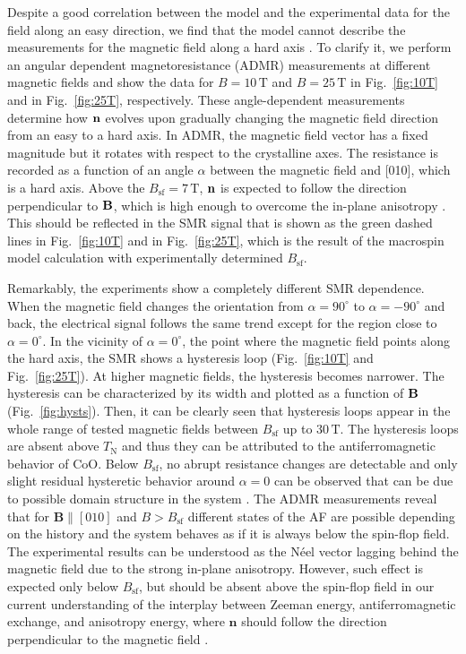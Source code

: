 \documentclass[%
 aps,
prl,
superscriptaddress,
 amsmath,amssymb,
reprint,%
]{revtex4-2}
\begin{document}
Despite a good correlation between the model and the experimental data for the field along an easy direction, we find that the model cannot describe the measurements for the magnetic field along a hard axis \cite{supplement}. To clarify it, we perform an angular dependent magnetoresistance (ADMR) measurements at different magnetic fields and show the data for $B = 10\,\text{T}$ and $B = 25\,\text{T}$ in Fig.~\ref{fig:10T} and in Fig.~\ref{fig:25T}, respectively. These angle-dependent measurements determine how $\bf{n}$ evolves upon gradually changing the magnetic field direction from an easy to a hard axis. In ADMR, the magnetic field vector has a fixed magnitude but it rotates with respect to the crystalline axes. The resistance is recorded as a function of an angle $\alpha$ between the magnetic field and [010], which is a hard axis. Above the $B_{\text{sf}}=7\,\text{T}$, $\bf{n}$ is expected to follow the direction perpendicular to $\bf{B}$, which is high enough to overcome the in-plane anisotropy \cite{Geprags2020JAP}. This should be reflected in the SMR signal that is shown as the green dashed lines in Fig.~\ref{fig:10T} and in Fig.~\ref{fig:25T}, which is the result of the macrospin model calculation with experimentally determined $B_\text{sf}$.

Remarkably, the experiments show a completely different SMR dependence. When the magnetic field changes the orientation from $\alpha = 90^\circ$ to $\alpha = - 90^\circ$ and back, the electrical signal follows the same trend except for the region close to $\alpha=0^\circ$. In the vicinity of $\alpha=0^\circ$, the point where the magnetic field points along the hard axis, the SMR shows a hysteresis loop (Fig.~\ref{fig:10T} and Fig.~\ref{fig:25T}). At higher magnetic fields, the hysteresis becomes narrower. The hysteresis can be characterized by its width and plotted as a function of $\bf{B}$ (Fig.~\ref{fig:hysts}). Then, it can be clearly seen that hysteresis loops appear in the whole range of tested magnetic fields between $B_\text{sf}$ up to $30\,\text{T}$. The hysteresis loops are absent above $T_\text{N}$ and thus they can be attributed to the antiferromagnetic behavior of CoO. Below $B_\text{sf}$, no abrupt resistance changes are detectable and only slight residual hysteretic behavior around $\alpha=0$ can be observed that can be due to possible domain structure in the system \cite{supplement}. The ADMR measurements reveal that for $\mathbf{B} \parallel [010]$ and $B > B_\text{sf}$ different states of the AF are possible depending on the history and the system behaves as if it is always below the spin-flop field. The experimental results can be understood as the N\'eel vector lagging behind the magnetic field due to the strong in-plane anisotropy. However, such effect is expected only below $B_\text{sf}$, but should be absent above the spin-flop field in our current understanding of the interplay between Zeeman energy, antiferromagnetic exchange, and anisotropy energy, where $\mathbf{n}$ should follow the direction perpendicular to the magnetic field \cite{Geprags2020JAP}.
\end{document}
